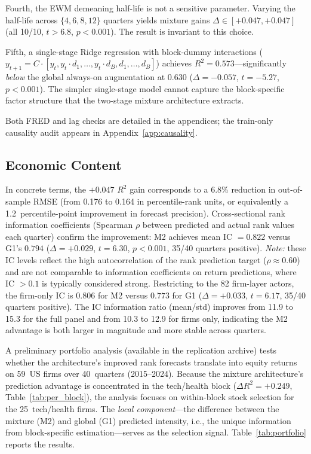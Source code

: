 \documentclass[11pt,a4paper]{article}
\begin{document}
Fourth, the EWM demeaning half-life is not a sensitive parameter. Varying the half-life across $\{4, 6, 8, 12\}$ quarters yields mixture gains $\Delta \in [+0.047, +0.047]$ (all 10/10, $t > 6.8$, $p < 0.001$). The result is invariant to this choice.

Fifth, a single-stage Ridge regression with block-dummy interactions ($y_{t+1} = C \cdot [y_t, y_t \cdot d_1, \ldots, y_t \cdot d_B, d_1, \ldots, d_B]$) achieves $R^2 = 0.573$---significantly \emph{below} the global always-on augmentation at 0.630 ($\Delta = -0.057$, $t = -5.27$, $p < 0.001$). The simpler single-stage model cannot capture the block-specific factor structure that the two-stage mixture architecture extracts.

Both FRED and lag checks are detailed in the appendices; the train-only causality audit appears in Appendix~\ref{app:causality}.

\subsection{Economic Content}
\label{sec:economic}

In concrete terms, the $+0.047$ $R^2$ gain corresponds to a 6.8\% reduction in out-of-sample RMSE (from 0.176 to 0.164 in percentile-rank units, or equivalently a 1.2~percentile-point improvement in forecast precision). Cross-sectional rank information coefficients (Spearman $\rho$ between predicted and actual rank values each quarter) confirm the improvement: M2 achieves mean IC $= 0.822$ versus G1's $0.794$ ($\Delta = +0.029$, $t = 6.30$, $p < 0.001$, 35/40 quarters positive). \emph{Note:} these IC levels reflect the high autocorrelation of the rank prediction target ($\rho \approx 0.60$) and are not comparable to information coefficients on return predictions, where IC $> 0.1$ is typically considered strong. Restricting to the 82 firm-layer actors, the firm-only IC is $0.806$ for M2 versus $0.773$ for G1 ($\Delta = +0.033$, $t = 6.17$, 35/40 quarters positive). The IC information ratio (mean/std) improves from 11.9 to 15.3 for the full panel and from 10.3 to 12.9 for firms only, indicating the M2 advantage is both larger in magnitude and more stable across quarters.

A preliminary portfolio analysis (available in the replication archive) tests whether the architecture's improved rank forecasts translate into equity returns on 59~US firms over 40~quarters (2015--2024). Because the mixture architecture's prediction advantage is concentrated in the tech/health block ($\Delta R^2 = +0.249$, Table~\ref{tab:per_block}), the analysis focuses on within-block stock selection for the 25~tech/health firms. The \emph{local component}---the difference between the mixture (M2) and global (G1) predicted intensity, i.e., the unique information from block-specific estimation---serves as the selection signal. Table~\ref{tab:portfolio} reports the results.
\end{document}
